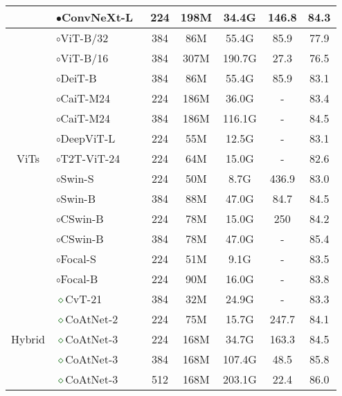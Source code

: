 \documentclass[runningheads]{llncs}
\begin{document}
\begin{table*}[!t]
\begin{tabular}{c|l|ccccc}
& \textcolor{blueish}{$\bullet$}ConvNeXt-L~\cite{liu2022convnet} & 224 & 198M & 34.4G  & 146.8 & 84.3 \\
\midrule
\multirow{13}{*}{ViTs} & \textcolor{brickred}{$\circ$}ViT-B/32~\cite{dosovitskiy2020image} & 384 & 86M & 55.4G  &  85.9 & 77.9 \\
& \textcolor{brickred}{$\circ$}ViT-B/16~\cite{dosovitskiy2020image} & 384 & 307M & 190.7G & 27.3  & 76.5 \\
& \textcolor{brickred}{$\circ$}DeiT-B~\cite{touvron2021training} & 384 & 86M & 55.4G & 85.9 & 83.1 \\
& \textcolor{brickred}{$\circ$}CaiT-M24~\cite{touvron2021going} & 224 & 186M & 36.0G  & - & 83.4 \\
& \textcolor{brickred}{$\circ$}CaiT-M24~\cite{touvron2021going} & 384 & 186M & 116.1G & - & 84.5 \\
& \textcolor{brickred}{$\circ$}DeepViT-L~\cite{zhou2021deepvit} & 224 & 55M & 12.5G & - & 83.1 \\
& \textcolor{brickred}{$\circ$}T2T-ViT-24~\cite{yuan2021tokens} & 224 & 64M & 15.0G  & - & 82.6 \\
& \textcolor{brickred}{$\circ$}Swin-S~\cite{liu2021swin} & 224 & 50M & 8.7G & 436.9 &  83.0 \\
& \textcolor{brickred}{$\circ$}Swin-B~\cite{liu2021swin} & 384 & 88M & 47.0G & 84.7 &  84.5 \\
& \textcolor{brickred}{$\circ$}CSwin-B~\cite{dong2021cswin} & 224 & 78M & 15.0G & 250 & 84.2 \\
& \textcolor{brickred}{$\circ$}CSwin-B~\cite{dong2021cswin} & 384 & 78M & 47.0G & - & 85.4 \\
& \textcolor{brickred}{$\circ$}Focal-S~\cite{yang2021focal} & 224 & 51M & 9.1G & - & 83.5 \\
& \textcolor{brickred}{$\circ$}Focal-B~\cite{yang2021focal} & 224 & 90M & 16.0G & - & 83.8 \\
\midrule
\multirow{17}{*}{Hybrid} &
\textcolor{darkgreen}{$\diamond$}CvT-21~\cite{wu2021cvt} & 384 & 32M & 24.9G  & - & 83.3 \\
& \textcolor{darkgreen}{$\diamond$}CoAtNet-2~\cite{dai2021coatnet} & 224 & 75M & 15.7G  & 247.7 &  84.1 \\
& \textcolor{darkgreen}{$\diamond$}CoAtNet-3~\cite{dai2021coatnet} & 224 & 168M & 34.7G  & 163.3 & 84.5 \\
& \textcolor{darkgreen}{$\diamond$}CoAtNet-3~\cite{dai2021coatnet} & 384 & 168M & 107.4G &  48.5 & 85.8 \\
& \textcolor{darkgreen}{$\diamond$}CoAtNet-3~\cite{dai2021coatnet} & 512 & 168M & 203.1G &  22.4 & 86.0 \\

\end{tabular}
\end{table*}
\end{document}
